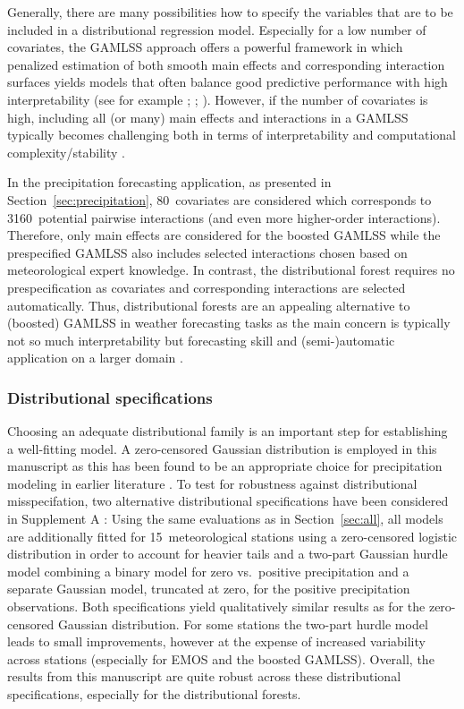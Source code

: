 \documentclass[aoas, preprint]{imsart}
\numberwithin{equation}{subsection}
\begin{document}
Generally, there are many possibilities how to specify the variables that are
to be included in a distributional regression model. Especially for a low number
of covariates, the GAMLSS approach offers a powerful framework in which
penalized estimation of both smooth main effects and corresponding interaction surfaces
yields models that often balance good predictive performance with high
interpretability (see for example \citealp{Wood+Scheipl+Faraway:2013}; 
\citealp{Goicoa+Adin+Ugarte:2018}; \citealp{Ugarte+Adin+Goicoa:2017}).
However, if the number of covariates is high, including all (or many)
main effects and interactions in a GAMLSS typically becomes challenging both in terms
of interpretability and computational complexity/stability
\citep[see also][]{Hofner+Mayr+Schmid:2016}.

In the precipitation forecasting application, as presented in 
Section~\ref{sec:precipitation}, 80~covariates are considered which corresponds 
to 3160~potential pairwise interactions (and even more higher-order interactions). 
Therefore, only main effects are considered for the boosted GAMLSS while
the prespecified GAMLSS also includes selected interactions chosen based on
meteorological expert knowledge. In contrast, the distributional forest requires no
prespecification as covariates and corresponding interactions are selected automatically.
Thus, distributional forests are an appealing alternative to (boosted) GAMLSS
in weather forecasting tasks as the main concern is typically not so much
interpretability but forecasting skill and (semi-)automatic application on a
larger domain \citep[see also the discussion in][]{Rasp+Lerch:2018}.


\subsubsection*{Distributional specifications}

Choosing an adequate distributional family is an important step for
establishing a well-fitting model. A zero-censored Gaussian distribution is
employed in this manuscript as this has been found to be an appropriate choice
for precipitation modeling in earlier literature
\citep[e.g.,][]{Stauffer+Mayr+Messner:2017}. 
To test for robustness against distributional misspecifation, 
two alternative distributional specifications have been considered
in Supplement A \citep{Schlosser+Hothorn+Stauffer:2018a}: Using the
same evaluations as in Section~\ref{sec:all}, all models are
additionally fitted for 15~meteorological stations using a zero-censored
logistic distribution in order to account for heavier tails and a two-part
Gaussian hurdle model combining a binary model for zero vs.~positive
precipitation and a separate Gaussian model, truncated at zero, for the
positive precipitation observations. Both specifications yield qualitatively 
similar results as for the zero-censored Gaussian distribution. For some stations
the two-part hurdle model leads to small improvements, however at the expense
of increased variability across stations (especially for EMOS and the 
boosted GAMLSS). Overall, the results from this manuscript are quite
robust across these distributional specifications, especially for the
distributional forests.
\end{document}
